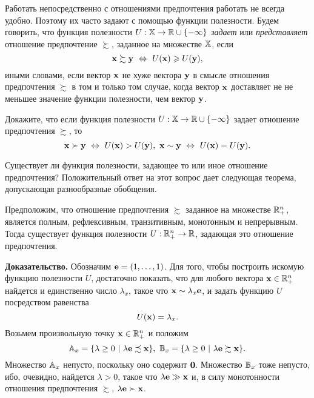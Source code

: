     Работать непосредственно с отношениями предпочтения работать не
    всегда удобно. Поэтому их часто задают с помощью функции
    полезности. Будем говорить, что функция полезности
    $U:\mathbb{X}\rightarrow \mathbb{R}\cup\{-\infty\}$ \emph{задает} или \emph{представляет}
    отношение предпочтение $\succsim$, заданное на множестве
    $\mathbb{X}$, если
    \[\vc{x}\succsim\vc{y} \ \Leftrightarrow \ U(\vc{x})\geqslant U(\vc{y}),\]
    иными словами, если вектор $\mathbf{x}$ не хуже вектора $\mathbf{y}$ в
    смысле отношения предпочтения $\succsim$ в том и только том
    случае, когда вектор $\mathbf{x}$ доставляет не не меньшее значение
    функции полезности, чем вектор $\mathbf{y}$.

\begin{exer}
    Докажите, что если функция полезности $U:\mathbb{X}\rightarrow \mathbb{R}\cup\{-\infty\}$
    задает отношение предпочтения $\succsim$, то
    \[\vc{x}\succ\vc{y} \ \Leftrightarrow \ U(\vc{x})> U(\vc{y}), \
    \vc{x}\sim\vc{y} \ \Leftrightarrow \ U(\vc{x})= U(\vc{y}).\]
\end{exer}


    Существует ли функция полезности, задающее то или иное отношение
    предпочтения? Положительный ответ на этот вопрос дает следующая
    теорема, допускающая разнообразные обобщения.

\begin{teop}
    Предположим, что отношение предпочтения $\succsim$ заданное на
    множестве $\mathbb{R}_{+}^{n}$, является полным, рефлексивным,
    транзитивным, монотонным и непрерывным. Тогда существует функция
    полезности $U:\mathbb{R}_{+}^{n}\rightarrow \mathbb{R}$, задающая это отношение
    предпочтения.
\end{teop}

    \textbf{Доказательство.} Обозначим $\mathbf{e}=(1,\ldots,1)$.
    Для того, чтобы построить
    искомую функцию полезности $U$, достаточно показать, что для
    любого вектора $\mathbf{x}\in \mathbb{R}_{+}^{n}$ найдется и единственно число
    $\lambda_{x}$, такое что $\mathbf{x}\sim\lambda_{x}\mathbf{e}$,
    и задать функцию $U$ посредством равенства
    \[U(\mathbf{x})=\lambda_{x}.\]
    Возьмем произвольную точку $\mathbf{x}\in \mathbb{R}_{+}^{n}$ и положим
    \[\st{A}_{x}=\{\lambda\geq0 \  | \ \lambda\vc{e}\precsim\vc{x}\}, \
    \st{B}_{x}=\{\lambda\geq0 \  | \ \lambda\vc{e}\succsim\vc{x}\}.\]
    Множество $\mathbb{A}_{x}$ непусто, поскольку оно содержит $\mathbf{0}$.
    Множество $\mathbb{B}_{x}$ тоже непусто, ибо, очевидно, найдется
     $\lambda>0$, такое что $\lambda\mathbf{e}\gg\mathbf{x}$ и, в силу
    монотонности отношения предпочтения $\succsim$,
    $\lambda\mathbf{e}\succ\mathbf{x}$.

